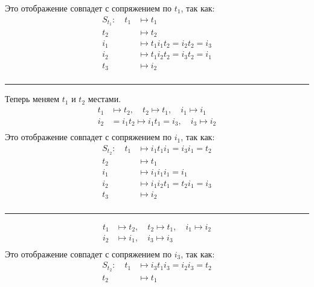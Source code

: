 \documentclass{article}
\begin{document}
\begin{enumerate}
\begin{itemize}
                Это отображение совпадет с сопряжением по $t_1$, так как:
                \begin{align*}
                    S_{t_1}:\quad t_1&\mapsto t_1\\
                    t_2&\mapsto t_2\\
                    i_1&\mapsto t_1i_1t_2 = i_2t_2 = i_3\\
                    i_2&\mapsto t_1i_2t_2 = i_3t_2 = i_1\\
                    t_3&\mapsto i_2\\
                \end{align*}
                \hrule
                \vspace{2ex}
                Теперь меняем $t_1$ и $t_2$ местами.
                \begin{align*}
                    t_1&\mapsto t_2,\quad t_2\mapsto t_1,\quad i_1\mapsto i_1\\
                    i_2&=i_1t_2\mapsto i_1t_1 = i_3,\quad i_3\mapsto i_2\\
                \end{align*}
                Это отображение совпадет с сопряжением по $i_1$, так как:
                \begin{align*}
                    S_{t_2}:\quad t_1&\mapsto i_1t_1i_1=i_3i_1=t_2\\
                    t_2&\mapsto t_1\\
                    i_1&\mapsto i_1i_1i_1 = i_1\\
                    i_2&\mapsto i_1i_2t_1 = t_2i_1 = i_3\\
                    t_3&\mapsto i_2\\
                \end{align*}
                \hrule
                \vspace{2ex}
                \begin{align*}
                    t_1&\mapsto t_2,\quad t_2\mapsto t_1,\quad i_1\mapsto i_2\\
                    i_2&\mapsto i_1,\quad i_3\mapsto i_3\\
                \end{align*}
                Это отображение совпадет с сопряжением по $i_3$, так как:
                \begin{align*}
                    S_{t_2}:\quad t_1&\mapsto i_3t_1i_3=i_2i_3=t_2\\
                    t_2&\mapsto t_1\\

\end{align*}
\end{itemize}
\end{enumerate}
\end{document}
